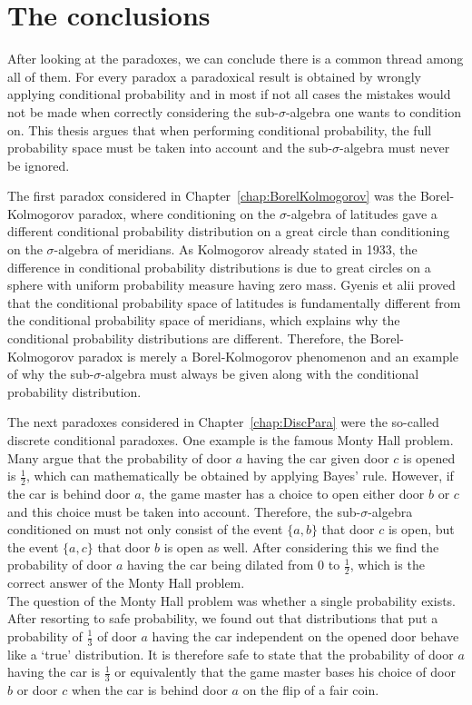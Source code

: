 \documentclass[a4paper]{report}
\theoremstyle{plain}
\theoremstyle{definition}
\theoremstyle{remark}
\numberwithin{equation}{chapter}
\DeclareMathOperator{\1}{\mathbbm{1}}
\begin{document}
\chapter{The conclusions}
After looking at the paradoxes, we can conclude there is a common thread among all of them. For every paradox a paradoxical result is obtained by wrongly applying conditional probability and in most if not all cases the mistakes would not be made when correctly considering the sub-$\sigma$-algebra one wants to condition on. This thesis argues that when performing conditional probability, the full probability space must be taken into account and the sub-$\sigma$-algebra must never be ignored.

The first paradox considered in Chapter~\ref{chap:BorelKolmogorov} was the Borel-Kolmogorov paradox, where conditioning on the $\sigma$-algebra of latitudes gave a different conditional probability distribution on a great circle than conditioning on the $\sigma$-algebra of meridians. As Kolmogorov \cite{Kolmogorov33} already stated in 1933, the difference in conditional probability distributions is due to great circles on a sphere with uniform probability measure having zero mass. Gyenis et alii \cite{Gyenis17} proved that the conditional probability space of latitudes is fundamentally different from the conditional probability space of meridians, which explains why the conditional probability distributions are different. Therefore, the Borel-Kolmogorov paradox is merely a Borel-Kolmogorov phenomenon and an example of why the sub-$\sigma$-algebra must always be given along with the conditional probability distribution.

The next paradoxes considered in Chapter~\ref{chap:DiscPara} were the so-called discrete conditional paradoxes. One example is the famous Monty Hall problem. Many argue that the probability of door $a$ having the car given door $c$ is opened is $\frac{1}{2}$, which can mathematically be obtained by applying Bayes' rule. However, if the car is behind door $a$, the game master has a choice to open either door $b$ or $c$ and this choice must be taken into account. Therefore, the sub-$\sigma$-algebra conditioned on must not only consist of the event $\{a,b\}$ that door $c$ is open, but the event $\{a,c\}$ that door $b$ is open as well. After considering this we find the probability of door $a$ having the car being dilated from $0$ to $\frac{1}{2}$, which is the correct answer of the Monty Hall problem.\\
The question of the Monty Hall problem was whether a single probability exists. After resorting to safe probability, we found out that distributions that put a probability of $\frac{1}{3}$ of door $a$ having the car independent on the opened door behave like a `true' distribution. It is therefore safe to state that the probability of door $a$ having the car is $\frac{1}{3}$ or equivalently that the game master bases his choice of door $b$ or door $c$ when the car is behind door $a$ on the flip of a fair coin.
\end{document}
